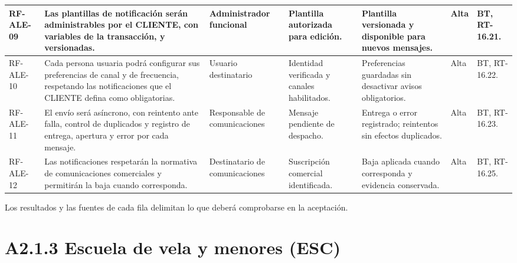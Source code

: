 \begin{longtable}{|L{0.080645\AnchoTablaAnexo}|L{0.262097\AnchoTablaAnexo}|L{0.100806\AnchoTablaAnexo}|L{0.145161\AnchoTablaAnexo}|L{0.173387\AnchoTablaAnexo}|L{0.060484\AnchoTablaAnexo}|L{0.177420\AnchoTablaAnexo}|}
RF-\allowbreak{}ALE-\allowbreak{}09 &
Las plantillas de notificación serán administrables por el CLIENTE, con variables de la transacción, y versionadas. &
Administrador funcional &
Plantilla autorizada para edición. &
Plantilla versionada y disponible para nuevos mensajes. &
Alta &
BT, RT-16.21. \\ \hline

RF-\allowbreak{}ALE-\allowbreak{}10 &
Cada persona usuaria podrá configurar sus preferencias de canal y de frecuencia, respetando las notificaciones que el CLIENTE defina como obligatorias. &
Usuario destinatario &
Identidad verificada y canales habilitados. &
Preferencias guardadas sin desactivar avisos obligatorios. &
Alta &
BT, RT-16.22. \\ \hline

RF-\allowbreak{}ALE-\allowbreak{}11 &
El envío será asíncrono, con reintento ante falla, control de duplicados y registro de entrega, apertura y error por cada mensaje. &
Responsable de comunicaciones &
Mensaje pendiente de despacho. &
Entrega o error registrado; reintentos sin efectos duplicados. &
Alta &
BT, RT-16.23. \\ \hline

RF-\allowbreak{}ALE-\allowbreak{}12 &
Las notificaciones respetarán la normativa de comunicaciones comerciales y permitirán la baja cuando corresponda. &
Destinatario de comunicaciones &
Suscripción comercial identificada. &
Baja aplicada cuando corresponda y evidencia conservada. &
Alta &
BT, RT-16.25. \\ \hline

\end{longtable}

Los resultados y las fuentes de cada fila delimitan lo que deberá comprobarse en la aceptación.

\clearpage\section*{A2.1.3 Escuela de vela y menores (ESC)}


